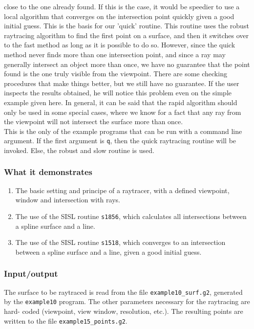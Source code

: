 close to the one already found.  If this is the case, it would be speedier to use a local 
algorithm that converges on the intersection point quickly given a good initial guess.  This is
the basis for our 'quick' routine.  This routine uses the robust raytracing algorithm to find
the first point on a surface, and then it switches over to the fast method as long as it is 
possible to do so.  However, since the quick method never finds more than one intersection point,
and since a ray may generally intersect an object more than once, we have no guarantee that
the point found is the one truly visible from the viewpoint.  There are some checking procedures
that make things better, but we still have no guarantee.   If the user inspects the results 
obtained, he will notice this problem even on the simple example given here.  In general, it
can be said that the rapid algorithm should only be used in some special cases, where we know
for a fact that any ray from the viewpoint will not intersect the surface more than once.\\

This is the only of the example programs that can be run with a command line argument.  If the 
first argument is \verb/q/, then the quick raytracing routine will be invoked.  Else, the
robust and slow routine is used.

\subsubsection{What it demonstrates}
\begin{enumerate}
\item The basic setting and principe of a raytracer, with a defined viewpoint, window and 
intersection with rays.
\item The use of the SISL routine \verb/s1856/, which calculates all intersections between a 
spline surface and a line.
\item The use of the SISL routine \verb/s1518/, which converges to an intersection between
a spline surface and a line, given a good initial guess.
\end{enumerate}
\subsubsection{Input/output}
The surface to be raytraced is read from the file \verb/example10_surf.g2/, generated by
the \verb/example10/ program.  The other parameters necessary for the raytracing are hard-
coded (viewpoint, view window, resolution, etc.).  The resulting points are written to the
file \verb/example15_points.g2/. 
